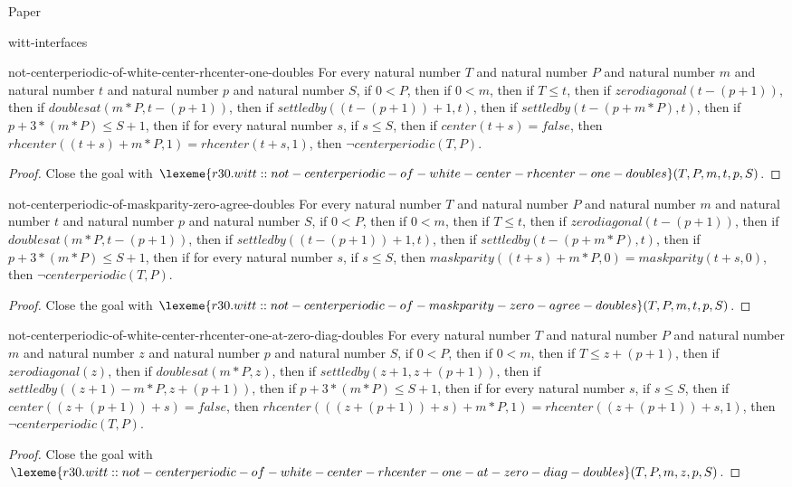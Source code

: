 \begin{lexlean}{Paper}
\begin{section}{witt-interfaces}
  \begin{theorem}{not-centerperiodic-of-white-center-rhcenter-one-doubles}
  For every natural number \(T\) and natural number \(P\) and natural number \(m\) and natural number \(t\) and natural number \(p\) and natural number \(S\), if \(0 < P\), then if \(0 < m\), then if \(T ≤ t\), then if \(zerodiagonal(t - (p + 1))\), then if \(doublesat(m * P, t - (p + 1))\), then if \(settledby((t - (p + 1)) + 1, t)\), then if \(settledby(t - (p + m * P), t)\), then if \(p + 3 * (m * P) ≤ S + 1\), then if for every natural number \(s\), if \(s ≤ S\), then if \(center(t + s) = false\), then \(rhcenter((t + s) + m * P, 1) = rhcenter(t + s, 1)\), then \(¬centerperiodic(T, P)\).
  \begin{proof}
  Close the goal with \(\lexeme{r30.witt::not-centerperiodic-of-white-center-rhcenter-one-doubles}(T, P, m, t, p, S)\).
  \end{proof}
  \end{theorem}

  \begin{theorem}{not-centerperiodic-of-maskparity-zero-agree-doubles}
  For every natural number \(T\) and natural number \(P\) and natural number \(m\) and natural number \(t\) and natural number \(p\) and natural number \(S\), if \(0 < P\), then if \(0 < m\), then if \(T ≤ t\), then if \(zerodiagonal(t - (p + 1))\), then if \(doublesat(m * P, t - (p + 1))\), then if \(settledby((t - (p + 1)) + 1, t)\), then if \(settledby(t - (p + m * P), t)\), then if \(p + 3 * (m * P) ≤ S + 1\), then if for every natural number \(s\), if \(s ≤ S\), then \(maskparity((t + s) + m * P, 0) = maskparity(t + s, 0)\), then \(¬centerperiodic(T, P)\).
  \begin{proof}
  Close the goal with \(\lexeme{r30.witt::not-centerperiodic-of-maskparity-zero-agree-doubles}(T, P, m, t, p, S)\).
  \end{proof}
  \end{theorem}

  \begin{theorem}{not-centerperiodic-of-white-center-rhcenter-one-at-zero-diag-doubles}
  For every natural number \(T\) and natural number \(P\) and natural number \(m\) and natural number \(z\) and natural number \(p\) and natural number \(S\), if \(0 < P\), then if \(0 < m\), then if \(T ≤ z + (p + 1)\), then if \(zerodiagonal(z)\), then if \(doublesat(m * P, z)\), then if \(settledby(z + 1, z + (p + 1))\), then if \(settledby((z + 1) - m * P, z + (p + 1))\), then if \(p + 3 * (m * P) ≤ S + 1\), then if for every natural number \(s\), if \(s ≤ S\), then if \(center((z + (p + 1)) + s) = false\), then \(rhcenter(((z + (p + 1)) + s) + m * P, 1) = rhcenter((z + (p + 1)) + s, 1)\), then \(¬centerperiodic(T, P)\).
  \begin{proof}
  Close the goal with \(\lexeme{r30.witt::not-centerperiodic-of-white-center-rhcenter-one-at-zero-diag-doubles}(T, P, m, z, p, S)\).
  \end{proof}
  \end{theorem}


\end{section}
\end{lexlean}
